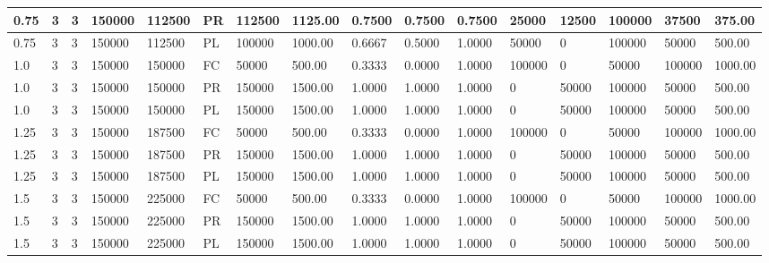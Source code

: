 \begin{tabular}{|l|l|l|l|l|l|l|l|l|l|l|l|l|l|l|l|}
0.75 & 3 & 3 & 150000 & 112500 & PR & 112500 & 1125.00 & 0.7500 & 0.7500 & 0.7500 & 25000 & 12500 & 100000 & 37500 & 375.00 \\ \hline
0.75 & 3 & 3 & 150000 & 112500 & PL & 100000 & 1000.00 & 0.6667 & 0.5000 & 1.0000 & 50000 & 0 & 100000 & 50000 & 500.00 \\ \hline
1.0 & 3 & 3 & 150000 & 150000 & FC & 50000 & 500.00 & 0.3333 & 0.0000 & 1.0000 & 100000 & 0 & 50000 & 100000 & 1000.00 \\ \hline
1.0 & 3 & 3 & 150000 & 150000 & PR & 150000 & 1500.00 & 1.0000 & 1.0000 & 1.0000 & 0 & 50000 & 100000 & 50000 & 500.00 \\ \hline
1.0 & 3 & 3 & 150000 & 150000 & PL & 150000 & 1500.00 & 1.0000 & 1.0000 & 1.0000 & 0 & 50000 & 100000 & 50000 & 500.00 \\ \hline
1.25 & 3 & 3 & 150000 & 187500 & FC & 50000 & 500.00 & 0.3333 & 0.0000 & 1.0000 & 100000 & 0 & 50000 & 100000 & 1000.00 \\ \hline
1.25 & 3 & 3 & 150000 & 187500 & PR & 150000 & 1500.00 & 1.0000 & 1.0000 & 1.0000 & 0 & 50000 & 100000 & 50000 & 500.00 \\ \hline
1.25 & 3 & 3 & 150000 & 187500 & PL & 150000 & 1500.00 & 1.0000 & 1.0000 & 1.0000 & 0 & 50000 & 100000 & 50000 & 500.00 \\ \hline
1.5 & 3 & 3 & 150000 & 225000 & FC & 50000 & 500.00 & 0.3333 & 0.0000 & 1.0000 & 100000 & 0 & 50000 & 100000 & 1000.00 \\ \hline
1.5 & 3 & 3 & 150000 & 225000 & PR & 150000 & 1500.00 & 1.0000 & 1.0000 & 1.0000 & 0 & 50000 & 100000 & 50000 & 500.00 \\ \hline
1.5 & 3 & 3 & 150000 & 225000 & PL & 150000 & 1500.00 & 1.0000 & 1.0000 & 1.0000 & 0 & 50000 & 100000 & 50000 & 500.00 \\ \hline
\end{tabular}
